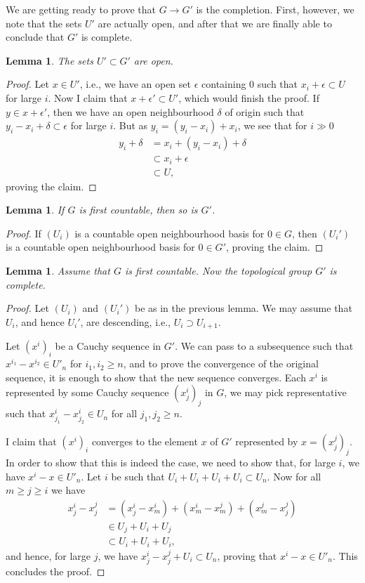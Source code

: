 \documentclass[12pt,a4paper,leqno]{article}
\theoremstyle{plain}
\newtheorem{lem}[theo]{Lemma}
\theoremstyle{definition}
\theoremstyle{remark}
\begin{document}
We are getting ready to prove that $G \to G'$ is the completion. First, however, we note that the sets $U'$ are actually open, and after that we are finally able to conclude that $G'$ is complete.

\begin{lem}
The sets $U' \subset G'$ are open.
\end{lem}
\begin{proof}
Let $x \in U'$, i.e., we have an open set $\epsilon$ containing $0$ such that $x_i + \epsilon \subset U$ for large $i$. Now I claim that $x + \epsilon' \subset U'$, which would finish the proof. If $y \in x + \epsilon'$, then we have an open neighbourhood $\delta$ of origin such that $y_i - x_i + \delta \subset \epsilon$ for large $i$. But as $y_i = (y_i - x_i) + x_i$, we see that for $i \gg 0$
\begin{align*}
y_i + \delta &= x_i + (y_i - x_i) + \delta \\
&\subset x_i + \epsilon \\
&\subset U,
\end{align*}
proving the claim.
\end{proof}

\begin{lem}
If $G$ is first countable, then so is $G'$.
\end{lem}
\begin{proof}
If $(U_i)$ is a countable open neighbourhood basis for $0 \in G$, then $(U_i')$ is a countable open neighbourhood basis for $0 \in G'$, proving the claim.
\end{proof}

\begin{lem}
Assume that $G$ is first countable. Now the topological group $G'$ is complete.
\end{lem}
\begin{proof}
Let $(U_i)$ and $(U_i')$ be as in the previous lemma. We may assume that $U_i$, and hence $U_i'$, are descending, i.e., $U_i \supset U_{i+1}$.

Let $(x^i)_i$ be a Cauchy sequence in $G'$. We can pass to a subsequence such that $x^{i_1} - x^{i_2} \in U'_n$ for $i_1, i_2 \geq n$, and to prove the convergence of the original sequence, it is enough to show that the new sequence converges. Each $x^i$ is represented by some Cauchy sequence $(x^i_j)_j$ in $G$, we may pick representative such that $x^i_{j_1} - x^i_{j_2} \in U_n$ for all $j_1, j_2 \geq n$. 

I claim that $(x^i)_i$ converges to the element $x$ of $G'$ represented by $x=(x^j_j)_j$. In order to show that this is indeed the case, we need to show that, for large $i$, we have $x^i - x \in U'_n$. Let $i$ be such that $U_i + U_i + U_i + U_i \subset U_n$. Now for all $m \geq j \geq i$ we have
\begin{align*}
x^i_j - x^j_j &= (x^i_j - x^i_m) + (x^i_m - x^j_m) + (x^j_m - x^j_j) \\
&\in U_j + U_i + U_j \\
&\subset U_i + U_i + U_i,
\end{align*}
and hence, for large $j$, we have $x^i_j - x^j_j + U_i \subset U_n$, proving that $x^i - x \in U'_n$. This concludes the proof.
\end{proof}
\end{document}
